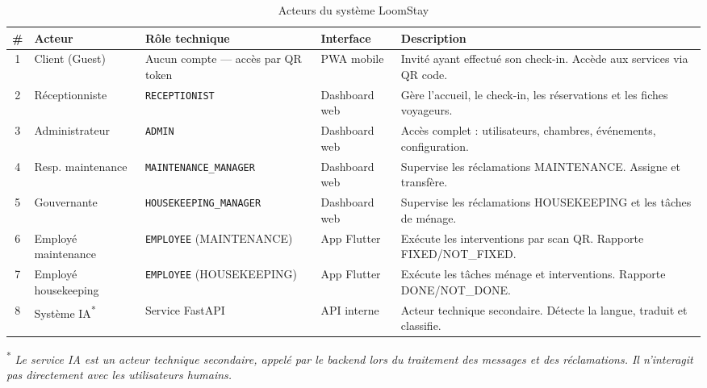 
\begin{table}[H]
\centering
\caption{Acteurs du système LoomStay}
\label{tab:acteurs}
\small
\begin{tabular}{|c|p{3cm}|p{3cm}|p{2cm}|p{4.5cm}|}
\hline
\textbf{\#} & \textbf{Acteur} & \textbf{Rôle technique} & \textbf{Interface} & \textbf{Description} \\
\hline
1 & Client (Guest) & Aucun compte — accès par QR token & PWA mobile & Invité ayant effectué son check-in. Accède aux services via QR code. \\
\hline
2 & Réceptionniste & \texttt{RECEPTIONIST} & Dashboard web & Gère l'accueil, le check-in, les réservations et les fiches voyageurs. \\
\hline
3 & Administrateur & \texttt{ADMIN} & Dashboard web & Accès complet : utilisateurs, chambres, événements, configuration. \\
\hline
4 & Resp. maintenance & \texttt{MAINTENANCE\_MANAGER} & Dashboard web & Supervise les réclamations MAINTENANCE. Assigne et transfère. \\
\hline
5 & Gouvernante & \texttt{HOUSEKEEPING\_MANAGER} & Dashboard web & Supervise les réclamations HOUSEKEEPING et les tâches de ménage. \\
\hline
6 & Employé maintenance & \texttt{EMPLOYEE} (MAINTENANCE) & App Flutter & Exécute les interventions par scan QR. Rapporte FIXED/NOT\_FIXED. \\
\hline
7 & Employé housekeeping & \texttt{EMPLOYEE} (HOUSEKEEPING) & App Flutter & Exécute les tâches ménage et interventions. Rapporte DONE/NOT\_DONE. \\
\hline
8 & Système IA\textsuperscript{*} & Service FastAPI & API interne & Acteur technique secondaire. Détecte la langue, traduit et classifie. \\
\hline
\end{tabular}
\end{table}

\noindent\textsuperscript{*} \textit{Le service IA est un acteur technique secondaire, appelé par le backend lors du traitement des messages et des réclamations. Il n'interagit pas directement avec les utilisateurs humains.}
